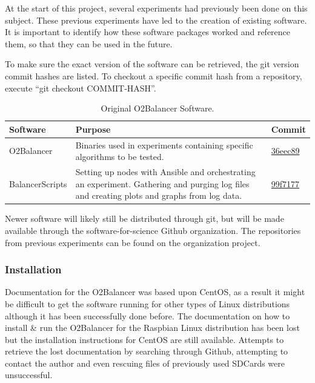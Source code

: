 \documentclass[]{article}
\begin{document}
At the start of this project, several experiments had previously been done on this subject. These previous experiments have led to the creation of existing software. It is important to identify how these software packages worked and reference them, so that they can be used in the future.

To make sure the exact version of the software can be retrieved, the git version commit hashes are listed. To checkout a specific commit hash from a repository, execute “git checkout COMMIT-HASH”.

\begin{table}[H]
	\begin{center}	
		\begin{tabularx}{\textwidth}{ | l | X | l | }
			\hline
			\textbf{Software} & \textbf{Purpose} & \textbf{Commit} \\ \hline
			
			O2Balancer\cite{O2Balancer_github} & Binaries used in experiments containing specific algorithms to be tested. & \href{https://github.com/valvy/O2-Balancer/tree/36eec890a1ec7c236d2d2363c6938dcb59fb4b3e}{36eec89} \\ \hline
			
			BalancerScripts\cite{balancerscripts_github} & Setting up nodes with Ansible and orchestrating an experiment. Gathering and purging log files and creating plots and graphs from log data. & \href{https://github.com/valvy/BalancerScripts/tree/99f7177bdaa4c98db65f17070dfcab350faccdb5}{99f7177} \\ \hline
		\end{tabularx}
		\caption{Original O2Balancer Software.}
		\label{tab:originalbalancer}
	\end{center}
\end{table}

Newer software will likely still be distributed through git, but will be made available through the software-for-science Github organization. The repositories from previous experiments can be found on the organization project\cite{software_for_science_github}.

\subsubsection*{Installation}
Documentation for the O2Balancer was based upon CentOS, as a result it might be difficult to get the software running for other types of Linux distributions although it has been successfully done before. The documentation on how to install \& run the O2Balancer for the Raspbian Linux distribution has been lost but the installation instructions for CentOS are still available\cite{O2BalancerCompilation}. Attempts to retrieve the lost documentation by searching through Github, attempting to contact the author and even rescuing files of previously used SDCards were unsuccessful.
\end{document}
